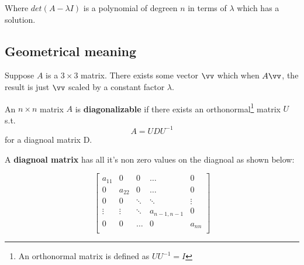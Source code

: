 Where $det(A-\lambda I)$ is a polynomial of degreen $n$ in terms of $\lambda$
which has a solution.

\subsection{Geometrical meaning}

\begin{center}
\usetikzlibrary {3d}
\end{center}

Suppose $A$ is a $3 \times 3$ matrix. There exists some vector $\vv$ which when
$A\vv$, the result is just $\vv$ scaled by a constant factor $\lambda$.

\begin{definition}
  An $n \times n$ matrix $A$ is \textbf{diagonalizable} if there exists an
  orthonormal\footnote{An orthonormal matrix is defined as $U U^{-1} = I$}
  matrix $U$ s.t. 
  \begin{displaymath}
    A = U D U^{-1}
  \end{displaymath}
  for a diagnoal matrix D.
\end{definition}

A \textbf{diagnoal matrix} has all it's non zero values on the diagnoal as
shown below:

\[
  \begin{bmatrix}
    a_{11} & 0 & 0 & \dots & 0 \\
    0 & a_{22} & 0 & \dots & 0 \\
    0 & 0 & \ddots & \ddots & \vdots \\
    \vdots & \vdots & \ddots & a_{n-1,n-1} & 0 \\
    0 & 0 & \dots & 0 & a_{nn} \\
  \end{bmatrix}
\]


